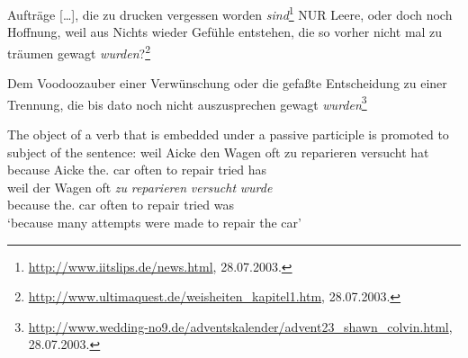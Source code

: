 \ex Aufträge [\ldots], die zu drucken vergessen worden \emph{sind}\footnote{
        \url{http://www.iitslips.de/news.html}, 28.07.2003.
}
\ex NUR Leere, oder doch noch Hoffnung, weil aus Nichts wieder Gefühle entstehen,
    die so vorher nicht mal zu träumen gewagt \emph{wurden}?\footnote{
        \url{http://www.ultimaquest.de/weisheiten_kapitel1.htm}, 28.07.2003.
}

\ex Dem Voodoozauber einer Verwünschung oder die gefaßte Entscheidung zu einer Trennung,
    die bis dato noch nicht auszusprechen gewagt \emph{wurden}\footnote{
        \url{http://www.wedding-no9.de/adventskalender/advent23_shawn_colvin.html}, 28.07.2003.
}
\zl
%

The object of a verb that is embedded under a passive participle is promoted to subject of the sentence:
\eal
\ex 
\gll weil    Aicke den        Wagen oft   zu reparieren versucht hat\\
     because Aicke the.\ACC{} car   often to repair     tried    has\\\german
\ex 
\gll weil    der        Wagen oft   \emph{zu} \emph{reparieren} \emph{versucht} \emph{wurde}\\
     because the.\NOM{} car   often to repair     tried    was\\
\glt `because many attempts were made to repair the car'\label{bsp-zu-reparieren-versucht-wurde-two}
\zl

